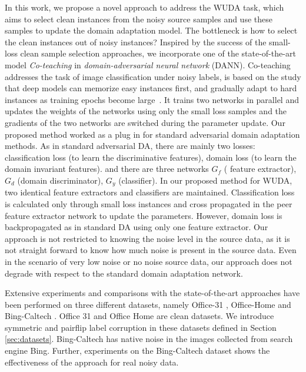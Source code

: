 In this work, we propose a novel approach to address the WUDA task, which aims to select clean instances from the noisy source samples and use these samples to update the domain adaptation model. 
The bottleneck is how to select the clean instances out of noisy instances?
Inspired by the success of the small-loss clean sample selection approaches, we incorporate one of the state-of-the-art model \textit{Co-teaching}\cite{coteaching} in \textit{domain-adversarial neural network} (DANN)\cite{dann}. 
Co-teaching addresses the task of image classification under noisy labels, is based on the study that deep models can memorize easy instances first, and gradually adapt to hard instances as training epochs become large~\cite{memorization}. 
It trains two networks in parallel and updates the weights of the networks using only the small loss samples and the gradients of the two networks are switched during the parameter update. 
Our proposed method worked as a plug in for standard adversarial domain adaptation methods.
As in standard adversarial DA, there are mainly two losses: classification loss (to learn the discriminative features), domain loss (to learn the domain invariant features). and there are three networks $G_f$ ( feature extractor), $G_d$ (domain discriminator), $G_y$ (classifier). In our proposed method for WUDA, two identical feature extractors and classifiers are maintained. Classification loss is calculated only through small loss instances and cross propagated in the peer feature extractor network to update the parameters. However, domain loss is backpropagated as in standard DA using only one feature extractor. Our approach is not restricted to knowing the noise level in the source data, as it is not straight forward to know how much noise is present in the source data. Even in the scenario of very low noise or no noise source data, our approach does not degrade with respect to the standard domain adaptation network.

Extensive experiments and comparisons with the state-of-the-art approaches have been performed on three different datasets, namely Office-31 \cite{office31}, Office-Home \cite{officehome} and Bing-Caltech 
\cite{bing-caltech}. Office 31 and Office Home are clean datasets. We introduce symmetric and pairflip 
label corruption in these datasets defined in Section \ref{sec:datasets}. Bing-Caltech has native noise in the images collected from search engine Bing. Further, experiments on the Bing-Caltech dataset shows the effectiveness of the approach for real noisy data.
